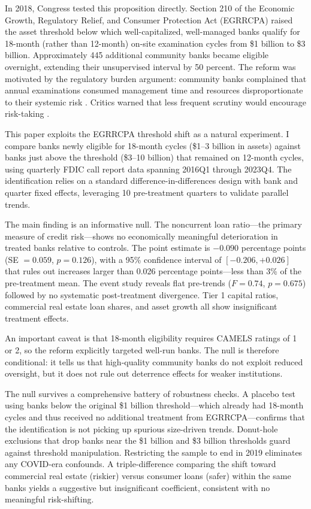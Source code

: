 \documentclass[12pt]{article}
\begin{document}
In 2018, Congress tested this proposition directly. Section 210 of the Economic Growth, Regulatory Relief, and Consumer Protection Act (EGRRCPA) raised the asset threshold below which well-capitalized, well-managed banks qualify for 18-month (rather than 12-month) on-site examination cycles from \$1 billion to \$3 billion. Approximately 445 additional community banks became eligible overnight, extending their unsupervised interval by 50 percent. The reform was motivated by the regulatory burden argument: community banks complained that annual examinations consumed management time and resources disproportionate to their systemic risk \citep{barr2022}. Critics warned that less frequent scrutiny would encourage risk-taking \citep{mishkin2019}.

This paper exploits the EGRRCPA threshold shift as a natural experiment. I compare banks newly eligible for 18-month cycles (\$1--3 billion in assets) against banks just above the threshold (\$3--10 billion) that remained on 12-month cycles, using quarterly FDIC call report data spanning 2016Q1 through 2023Q4. The identification relies on a standard difference-in-differences design with bank and quarter fixed effects, leveraging 10 pre-treatment quarters to validate parallel trends.

The main finding is an informative null. The noncurrent loan ratio---the primary measure of credit risk---shows no economically meaningful deterioration in treated banks relative to controls. The point estimate is $-0.090$ percentage points (SE $= 0.059$, $p = 0.126$), with a 95\% confidence interval of $[-0.206, +0.026]$ that rules out increases larger than 0.026 percentage points---less than 3\% of the pre-treatment mean. The event study reveals flat pre-trends ($F = 0.74$, $p = 0.675$) followed by no systematic post-treatment divergence. Tier 1 capital ratios, commercial real estate loan shares, and asset growth all show insignificant treatment effects.

An important caveat is that 18-month eligibility requires CAMELS ratings of 1 or 2, so the reform explicitly targeted well-run banks. The null is therefore conditional: it tells us that high-quality community banks do not exploit reduced oversight, but it does not rule out deterrence effects for weaker institutions.

The null survives a comprehensive battery of robustness checks. A placebo test using banks below the original \$1 billion threshold---which already had 18-month cycles and thus received no additional treatment from EGRRCPA---confirms that the identification is not picking up spurious size-driven trends. Donut-hole exclusions that drop banks near the \$1 billion and \$3 billion thresholds guard against threshold manipulation. Restricting the sample to end in 2019 eliminates any COVID-era confounds. A triple-difference comparing the shift toward commercial real estate (riskier) versus consumer loans (safer) within the same banks yields a suggestive but insignificant coefficient, consistent with no meaningful risk-shifting.
\end{document}
